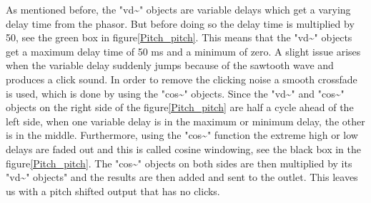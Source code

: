 As mentioned before, the "vd\textasciitilde" objects are variable delays which get a varying delay time from the phasor. But before doing so the delay time is multiplied by 50, see the green box in figure\ref{Pitch_pitch}. This means that the "vd\textasciitilde" objects get a maximum delay time of 50 ms and a minimum of zero. A slight issue arises when the variable delay suddenly jumps because of the sawtooth wave and produces a click sound. In order to remove the clicking noise a smooth crossfade is used, which is done by using the "cos\textasciitilde" objects. Since the "vd\textasciitilde" and "cos\textasciitilde" objects on the right side of the figure\ref{Pitch_pitch} are half a cycle ahead of the left side, when one variable delay is in the maximum or minimum delay, the other is in the middle. Furthermore, using the "cos\textasciitilde" function the extreme high or low delays are faded out and this is called cosine windowing, see the black box in the figure\ref{Pitch_pitch}. The "cos\textasciitilde" objects on both sides are then multiplied by its "vd\textasciitilde" objects" and the results are then added and sent to the outlet. This leaves us with a pitch shifted output that has no clicks.  